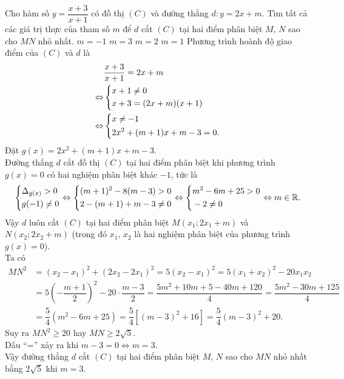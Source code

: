 \begin{ex}%
 Cho hàm số $y = \dfrac{x + 3}{x + 1}$ có đồ thị $(C)$ và đường thẳng $d: y = 2x + m$. Tìm tất cả các giá trị thực của tham số $m$ để $d$ cắt $(C)$ tại hai điểm phân biệt $M$, $N$ sao cho $MN$ nhỏ nhất.
 \choice
  {$m = -1$}
  {\True $m = 3$}
  {$m = 2$}
  {$m = 1$}
 \loigiai
  {
  Phương trình hoành độ giao điểm của $(C)$ và $d$ là
  \begin{align*}
   & \dfrac{x + 3}{x + 1} = 2x + m\\
   \Leftrightarrow & \left\{\begin{aligned}& x + 1 \neq 0 \\& x + 3 = (2x + m)(x + 1)\end{aligned}\right.\\
   \Leftrightarrow & \left\{\begin{aligned}& x \neq -1 \\& 2x^2 + (m + 1)x + m - 3 = 0.\end{aligned}\right.
  \end{align*}
  Đặt $g(x) = 2x^2 + (m + 1)x + m - 3$.\\
  Đường thẳng $d$ cắt đồ thị $(C)$ tại hai điểm phân biệt khi phương trình $g(x) = 0$ có hai nghiệm phân biệt khác $-1$, tức là
  \begin{align*}
   \left\{\begin{aligned}& \Delta_{g(x)} > 0 \\& g(-1) \neq 0\end{aligned}\right. \Leftrightarrow \left\{\begin{aligned}& (m+1)^2 - 8(m-3) > 0 \\& 2 - (m+1) + m - 3 \neq 0\end{aligned}\right. \Leftrightarrow \left\{\begin{aligned}& m^2 - 6m + 25 > 0 \\& -2 \neq 0\end{aligned}\right. \Leftrightarrow m \in \mathbb{R}.
  \end{align*}
  Vậy $d$ luôn cắt $(C)$ tại hai điểm phân biệt $M(x_1; 2x_1 + m)$ và $N(x_2; 2x_2 + m)$ (trong đó $x_1$, $x_2$ là hai nghiệm phân biệt của phương trình $g(x) = 0$).\\
  Ta có
  \begin{align*}
   MN^2 & = (x_2 - x_1)^2 + (2x_2 - 2x_1)^2 = 5(x_2 - x_1)^2 = 5(x_1 + x_2)^2 - 20x_1 x_2 \\
        & = 5\left( -\dfrac{m+1}{2} \right)^2 - 20 \cdot \dfrac{m-3}{2} = \dfrac{5m^2 + 10m + 5 - 40m + 120}{4} = \dfrac{5m^2 - 30m + 125}{4} \\
        & = \dfrac{5}{4}(m^2 - 6m + 25) = \dfrac{5}{4} \left[(m - 3)^2 + 16 \right] = \dfrac{5}{4}(m-3)^2 + 20.
  \end{align*}
  Suy ra $MN^2 \geq 20$ hay $MN \geq 2\sqrt{5}$.\\
  Dấu ``='' xảy ra khi $m - 3 = 0 \Leftrightarrow m = 3$.\\
  Vậy đường thẳng $d$ cắt $(C)$ tại hai điểm phân biệt $M$, $N$ sao cho $MN$ nhỏ nhất bằng $2\sqrt{5}$ khi $m = 3$.
  }
\end{ex}

